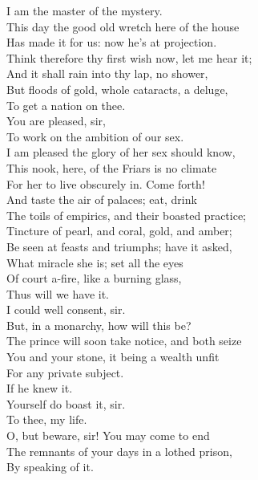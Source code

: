 \documentclass[a4paper,oneside,12pt]{memoir}
\begin{document}
\begin{drama*}
\mammonspeaks I am the master of the mystery.\\
This day the good old wretch here of the house\\
Has made it for us: now he's at projection.\\
Think therefore thy first wish now, let me hear it;\\
And it shall rain into thy lap, no shower,\\
But floods of gold, whole cataracts, a deluge,\\
To get a nation on thee.\\
\dolspeaks {} You are pleased, sir,\\
To work on the ambition of our sex.\\
\mammonspeaks I am pleased the glory of her sex should know,\\
This nook, here, of the Friars is no climate\\
For her to live obscurely in. Come forth!\\
And taste the air of palaces; eat, drink\\
The toils of empirics, and their boasted practice;\\
Tincture of pearl, and coral, gold, and amber;\\
Be seen at feasts and triumphs; have it asked,\\
What miracle she is; set all the eyes\\
Of court a-fire, like a burning glass,\\
Thus will we have it.\\
\dolspeaks {} I could well consent, sir.\\
But, in a monarchy, how will this be?\\
The prince will soon take notice, and both seize\\
You and your stone, it being a wealth unfit\\
For any private subject.\\
\mammonspeaks {} If he knew it.\\
\dolspeaks Yourself do boast it, sir.\\
\mammonspeaks {} To thee, my life.\\
\dolspeaks O, but beware, sir! You may come to end\\
The remnants of your days in a lothed prison,\\
By speaking of it.\\

\end{drama*}
\end{document}
